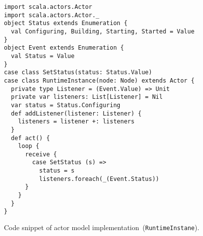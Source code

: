 \begin{figure}[tb]
  \begin{center}
    \begin{verbatim}
import scala.actors.Actor
import scala.actors.Actor._
object Status extends Enumeration {
  val Configuring, Building, Starting, Started = Value
}
object Event extends Enumeration {
  val Status = Value
}
case class SetStatus(status: Status.Value)
case class RuntimeInstance(node: Node) extends Actor {
  private type Listener = (Event.Value) => Unit
  private var listeners: List[Listener] = Nil
  var status = Status.Configuring
  def addListener(listener: Listener) {
    listeners = listener +: listeners
  }
  def act() {
    loop {
      receive {
        case SetStatus (s) =>
          status = s
          listeners.foreach(_(Event.Status))
      }
    }
  }
}
    \end{verbatim}
  \end{center}
  \caption{Code snippet of actor model implementation~(\texttt{RuntimeInstane}).}
  \label{list:runtimeinstance}
\end{figure}

